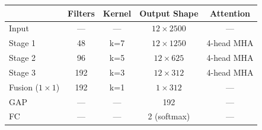 \documentclass[border=10pt]{standalone}
\begin{document}
\begin{tabular}{lcccc}
\toprule
 & \textbf{Filters} & \textbf{Kernel} & \textbf{Output Shape} & \textbf{Attention} \\
\midrule
Input          & ---  & ---  & $12 \times 2500$ & ---        \\
Stage 1        & 48   & k=7  & $12 \times 1250$ & 4-head MHA \\
Stage 2        & 96   & k=5  & $12 \times 625$  & 4-head MHA \\
Stage 3        & 192  & k=3  & $12 \times 312$  & 4-head MHA \\
Fusion ($1\times1$) & 192  & k=1  & $1 \times 312$   & ---        \\
GAP            & ---  & ---  & 192              & ---        \\
FC             & ---  & ---  & 2 (softmax)      & ---        \\
\bottomrule
\end{tabular}
\end{document}
